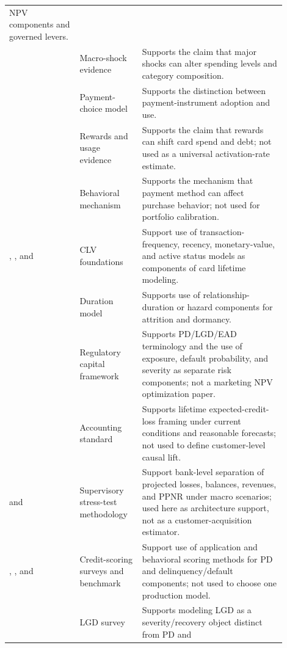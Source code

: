 \documentclass[11pt]{article}
\newcommand{\1}{\mathbf{1}}
\begin{document}
\begin{longtable}{p{0.23\linewidth}p{0.20\linewidth}p{0.47\linewidth}}
    NPV components and governed levers. \\
\citet{baker2020epidemic}
  & Macro-shock evidence
  & Supports the claim that major shocks can alter spending levels and
    category composition. \\
\citet{koulayev2012payment}
  & Payment-choice model
  & Supports the distinction between payment-instrument adoption and use. \\
\citet{agarwal2010rewards}
  & Rewards and usage evidence
  & Supports the claim that rewards can shift card spend and debt; not used as a
    universal activation-rate estimate. \\
\citet{prelec2001creditcard}
  & Behavioral mechanism
  & Supports the mechanism that payment method can affect purchase behavior;
    not used for portfolio calibration. \\
\citet{schmittlein1987counting}, \citet{fader2005bgnbd}, and \citet{fader2005rfm}
  & CLV foundations
  & Support use of transaction-frequency, recency, monetary-value, and active
    status models as components of card lifetime modeling. \\
\citet{bolton1998duration}
  & Duration model
  & Supports use of relationship-duration or hazard components for attrition
    and dormancy. \\
\citet{bcbs2006basel}
  & Regulatory capital framework
  & Supports PD/LGD/EAD terminology and the use of exposure, default
    probability, and severity as separate risk components; not a marketing NPV
    optimization paper. \\
\citet{fasb2016asu201613}
  & Accounting standard
  & Supports lifetime expected-credit-loss framing under current conditions
    and reasonable forecasts; not used to define customer-level causal lift. \\
\citet{federalreserve2025stressmethodology} and
\citet{federalreserve2026stressmethodology}
  & Supervisory stress-test methodology
  & Support bank-level separation of projected losses, balances, revenues, and
    PPNR under macro scenarios; used here as architecture support, not as a
    customer-acquisition estimator. \\
\citet{hand1997credit}, \citet{thomas2000survey}, and
\citet{lessmann2015benchmarking}
  & Credit-scoring surveys and benchmark
  & Support use of application and behavioral scoring methods for PD and
    delinquency/default components; not used to choose one production model. \\
\citet{schuermann2004lgd}
  & LGD survey
  & Supports modeling LGD as a severity/recovery object distinct from PD and

\end{longtable}
\end{document}
